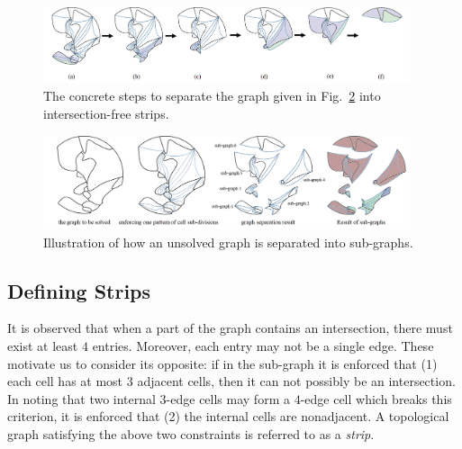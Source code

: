 \documentclass[journal]{IEEEtran}
\begin{document}
\begin{figure}[t]
\centering
\includegraphics[width=0.96\textwidth]{figures/steps_2}
\caption{The concrete steps to separate the graph given in Fig.~\ref{fig:complicated_graph} into intersection-free strips. }\label{fig:steps}
\end{figure}

\begin{figure}[t]
\centering
\includegraphics[width =0.96\textwidth]{figures/graph_separation_2}
\caption{Illustration of how an unsolved graph is separated into sub-graphs. }\label{fig:complicated_graph}
\end{figure}




\subsection{Defining Strips}
It is observed that when a part of the graph contains an intersection, there must exist at least $4$ entries. Moreover, each entry may not be a single edge.  
These motivate us to consider its opposite: if in the sub-graph it is enforced that (1) each cell has at most $3$ adjacent cells, then it can not possibly be an intersection. In noting that two internal $3$-edge cells may form a $4$-edge cell which breaks this criterion, it is enforced that (2) the internal cells are nonadjacent. 
A topological graph satisfying the above two constraints is referred to as a \textit{strip}. 
\end{document}
